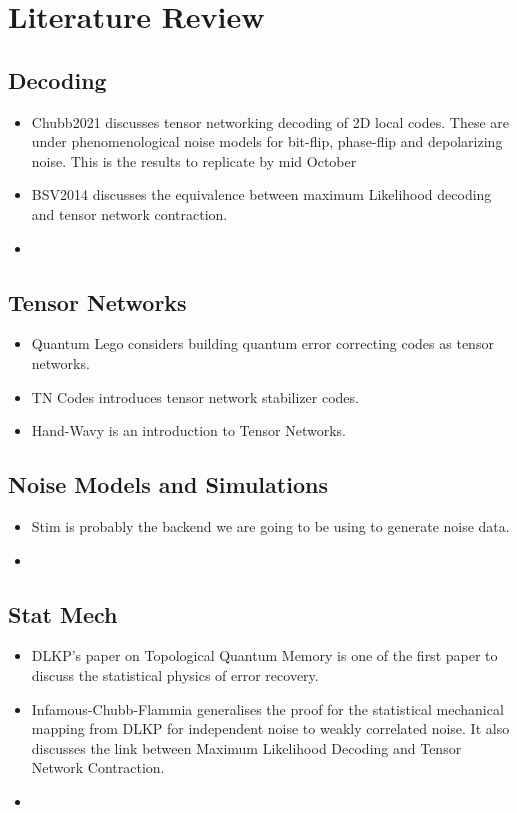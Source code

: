 \chapter{Literature Review}\label{ch: literature review}

\section{Decoding}\label{sec: decoding-lit-rev}
\begin{itemize}
    \item Chubb2021\cite{Chubb2021-se} discusses tensor networking decoding of 2D local codes. These are under phenomenological noise models for bit-flip, phase-flip and depolarizing noise. This is the results to replicate by mid October
    \item  BSV2014\cite{Bravyi2014-kw} discusses the equivalence between maximum Likelihood decoding and tensor network contraction.
    \item
\end{itemize}


\section{Tensor Networks}\label{sec: tensor-networks-lit-rev}
\begin{itemize}
    \item Quantum Lego\cite{Cao2022-xf} considers building quantum error correcting codes as tensor networks.
    \item TN Codes\cite{Farrelly2021-da} introduces tensor network stabilizer codes.
    \item Hand-Wavy\cite{Bridgeman2017-rk} is an introduction to Tensor Networks.
\end{itemize}

\section{Noise Models and Simulations}\label{sec: noise-models-lit-rev}
\begin{itemize}
    \item Stim\cite{Gidney2021-am} is probably the backend we are going to be using to generate noise data.
    \item
\end{itemize}

\section{Stat Mech}\label{sec: stat-mech-lit-rev}
\begin{itemize}
    \item DLKP's\cite{Dennis2002-wo} paper on Topological Quantum Memory is one of the first paper to discuss the statistical physics of error recovery.
    \item Infamous-Chubb-Flammia\cite{Chubb2018-gh} generalises the proof for the statistical mechanical mapping from DLKP\cite{Dennis2002-wo} for independent noise to weakly correlated noise. It also discusses the link between Maximum Likelihood Decoding and Tensor Network Contraction.
    \item
\end{itemize}
